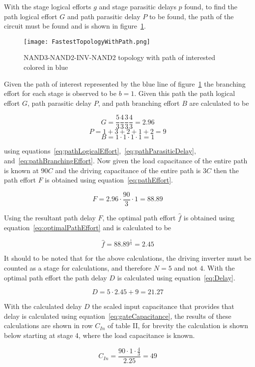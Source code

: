 \documentclass[conference]{IEEEtran}
\begin{document}
  With the stage logical efforts $g$ and stage parasitic delays $p$ found, to find the path logical effort $G$ and path parasitic delay $P$ to be found, the path of the circuit must be found and is shown in figure~\ref{fig:CircuitPath}.

  \begin{figure}[H]
  \center
    \texttt{[image: FastestTopologyWithPath.png]}
    \caption{NAND3-NAND2-INV-NAND2 topology with path of interested colored in blue}
    \label{fig:CircuitPath}
  \end{figure}

  Given the path of interest represented by the blue line of figure~\ref{fig:CircuitPath} the branching effort for each stage is observed to be $b = 1$. Given this path the path logical effort $G$, path parasitic delay $P$, and path branching effort $B$ are calculated to be 


  $$ G = \frac{5}{3}\frac{4}{3}\frac{3}{3}\frac{4}{3} = 2.96 $$
  $$ P = 1 + 3 + 2 + 1 + 2 = 9 $$
  $$ B = 1\cdot1\cdot1\cdot1 = 1 $$

  using equations~\ref{eq:pathLogicalEffort},~\ref{eq:pathParasiticDelay}, and~\ref{eq:pathBranchingEffort}. Now given the load capacitance of the entire path is known at $90C$ and the driving capacitance of the entire path is $3C$ then the path effort $F$ is obtained using equation~\ref{eq:pathEffort}.

  $$ F = 2.96\cdot\frac{90}{3}\cdot1=88.89 $$

  Using the resultant path delay $F$, the optimal path effort $\hat{f}$ is obtained using equation~\ref{eq:optimalPathEffort} and is calculated to be

  $$ \hat{f} = 88.89^{\frac{1}{5}} = 2.45 $$

  It should to be noted that for the above calculations, the driving inverter must be counted as a stage for calculations, and therefore $N = 5$ and not $4$. With the optimal path effort the path delay $D$ is calculated using equation~\ref{eq:Delay}.

  $$ D = 5\cdot2.45+9 = 21.27 $$

  With the calculated delay $D$ the scaled input capacitance that provides that delay is calculated using equation~\ref{eq:gateCapacitance}, the results of these calculations are shown in row $C_{In}$ of table II, for brevity the calculation is shown below starting at stage 4, where the load capacitance is known.  

  $$ C_{In} = \frac{90\cdot1\cdot\frac{4}{3}}{2.25} = 49$$
\end{document}
